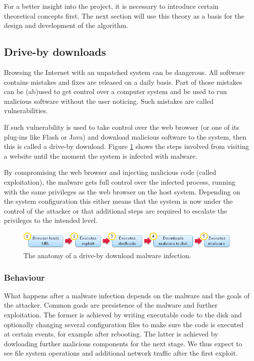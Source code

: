 For a better insight into the project, it is necessary to introduce certain theoretical concepts first. The next section will use this theory as a basis for the design and development of the algorithm.

\subsection{Drive-by downloads}

Browsing the Internet with an unpatched system can be dangerous. All software contains mistakes and fixes are released on a daily basis. Part of those mistakes can be (ab)used to get control over a computer system and be used to run malicious software without the user noticing. Such mistakes are called vulnerabilities.

If such vulnerability is used to take control over the web browser (or one of its plug-ins like Flash or Java) and download malicious software to the system, then this is called a drive-by download\cite{Le2013}. Figure \ref{fig:dbdownload} shows the steps involved from visiting a website until the moment the system is infected with malware.

By compromising the web browser and injecting malicious code (called exploitation), the malware gets full control over the infected process, running with the same privileges as the web browser on the host system. Depending on the system configuration this either means that the system is now under the control of the attacker or that additional steps are required to escalate the privileges to the intended level.

\begin{figure}[h]
    \centering
    \includegraphics[width=12cm]{Images/drive-by-download.png}
    \caption{The anatomy of a drive-by download malware infection. \cite{dbdownload-anatomy}}
    \label{fig:dbdownload}
\end{figure}

\subsubsection{Behaviour}
\label{sec:behavior}

What happens after a malware infection depends on the malware and the goals of the attacker. Common goals are persistence of the malware and further exploitation. The former is achieved by writing executable code to the disk and optionally changing several configuration files to make sure the code is executed at certain events, for example after rebooting. The latter is achieved by dowloading further malicious components for the next stage. We thus expect to see file system operations and additional network traffic after the first exploit.

